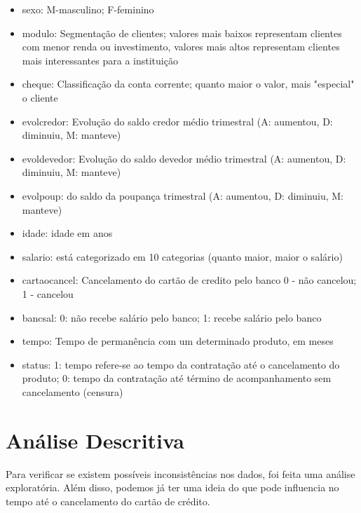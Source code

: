 \documentclass{article}\usepackage[]{graphicx}\usepackage[]{color}
\begin{document}
\begin{itemize}
  \item sexo: M-masculino; F-feminino
  \item modulo: Segmentação de clientes; valores mais baixos representam clientes com menor renda ou investimento, valores mais altos representam clientes mais interessantes para a instituição
  \item cheque: Classificação da conta corrente; quanto maior o valor, mais "especial" o cliente
  \item evolcredor: Evolução do saldo credor médio trimestral (A: aumentou, D: diminuiu, M: manteve)
  \item evoldevedor: Evolução do saldo devedor médio trimestral (A: aumentou, D: diminuiu, M: manteve)
  \item evolpoup:  do saldo da poupança trimestral (A: aumentou, D: diminuiu, M: manteve)
  \item idade: idade em anos
  \item salario: está categorizado em 10 categorias (quanto maior, maior o salário)
  \item cartaocancel: Cancelamento do cartão de credito pelo banco 0 - não cancelou; 1 - cancelou
  \item bancsal: 0: não recebe salário pelo banco; 1: recebe salário pelo banco
  \item tempo: Tempo de permanência com um determinado produto, em meses
  \item status: 1: tempo refere-se ao tempo da contratação até o cancelamento do produto; 0: tempo da contratação até término de acompanhamento sem cancelamento (censura)
\end{itemize}

\section{Análise Descritiva}



Para verificar se existem possíveis inconsistências nos dados, foi feita uma análise exploratória. Além disso, podemos já ter uma ideia do que pode influencia no tempo até o cancelamento do cartão de crédito. 
\end{document}
